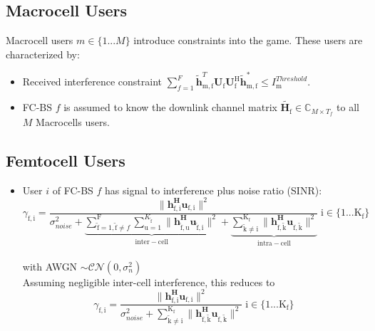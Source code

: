 \documentclass[12pt,a4paper]{report}
\begin{document}
\subsection{Macrocell Users}
Macrocell users $m \in \{1 ... M\}$ introduce constraints into the game. These users are characterized by:

\begin{itemize}
\item 
	Received interference constraint
	$\sum^F_{f=1} \mathbf{\tilde{h}}_{\mathrm{m,f}}^T  \mathbf{U_{\mathrm{f}}} 						
	\mathbf{U_{\mathrm{f}}^{\mathrm{H}}} \mathbf{\tilde{h}_{\mathrm{m,f}}^*} \leq I^{Threshold}		
	_{\mathrm{m}} $.

\item 
	FC-BS $f$ is assumed to know the downlink channel matrix $\tilde{\mathbf{H}_{\mathrm{f}}} \in \mathbb{C}_{M \times T_f}$ to all $M$ Macrocells users.
\\
\end{itemize}

\subsection{Femtocell Users}
\begin{itemize}

\item User $i$ of FC-BS $f$ has signal to interference plus noise ratio (SINR):
	\begin{equation*}
	\gamma_{\mathrm{f,i}} = \frac{\|\mathbf{h^H_{\mathrm{f,i}}u_{\mathrm{f,i}}}\|^2}
	{\sigma^2_{noise}   +
	\underbrace{
	 \sum_{\mathrm{\tilde{f}}=1,\mathrm{\tilde{f}}\neq f}^{\mathrm{F}} \sum_{\mathrm{u=1}}^{K_{\mathrm{\tilde{f}}}}
	\|\mathbf{h^H_{\mathrm{\tilde{f},u}}u_{\mathrm{\tilde{f},i}}}\|^2}_{\mathrm{inter-cell}}
	 + 
	 \underbrace{
	 \sum_{\mathrm{\tilde{k}\neq i}}^{\mathrm{K_f}}
	 \|\mathbf{h^H_{\mathrm{f,\tilde{k}}}u_{\mathrm{f,\tilde{k}}}}\|^2}_{\mathrm{intra-cell}}}
	  \; \mathrm{i \in \{1 ... K_f\}}\end{equation*}
\\
with AWGN $\sim \mathcal{CN}(0,\sigma^2_n)$
\\

Assuming negligible inter-cell interference, this reduces to
	\begin{equation*}
	\gamma_{\mathrm{f,i}} = \frac{\|\mathbf{h^H_{\mathrm{f,i}}u_{\mathrm{f,i}}}\|^2}
	{\sigma^2_{noise} 
	 + \sum_{\mathrm{\tilde{k}\neq i}}^{\mathrm{K_f}}
	  \|\mathbf{h^H_{\mathrm{f,\tilde{k}}}u_{\mathrm{f,\tilde{k}}}}\|^2}
	  \; \mathrm{i \in \{1 ... K_f\}}
	\end{equation*}
\\


\end{itemize}
\end{document}
